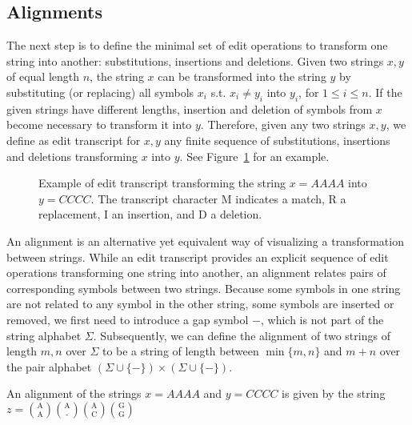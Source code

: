 \subsection{Alignments}

The next step is to define the minimal set of edit operations to transform one string into another: substitutions, insertions and deletions.
Given two strings $x,y$ of equal length $n$, the string $x$ can be transformed into the string $y$ by substituting (or replacing) all symbols $x_i$ s.t. $x_i \neq y_i$ into $y_i$, for $1 \leq i \leq n$.
If the given strings have different lengths, insertion and deletion of symbols from $x$ become necessary to transform it into $y$.
Therefore, given any two strings $x,y$, we define as edit transcript for $x,y$ any finite sequence of substitutions, insertions and deletions transforming $x$ into $y$.
See Figure~\ref{fig:edit-transcript} for an example.

\begin{figure}[h]
\begin{center}
\caption[Example of edit transcript.]{Example of edit transcript transforming the string $x=AAAA$ into $y=CCCC$. The transcript character M indicates a match, R a replacement, I an insertion, and D a deletion.}
\label{fig:edit-transcript}

\end{center}
\end{figure}

An alignment is an alternative yet equivalent way of visualizing a transformation between strings.
While an edit transcript provides an explicit sequence of edit operations transforming one string into another, an alignment relates pairs of corresponding symbols between two strings.
Because some symbols in one string are not related to any symbol in the other string, \ie some symbols are inserted or removed, we first need to introduce a gap symbol $-$, which is not part of the string alphabet $\Sigma$.
Subsequently, we can define the alignment of two strings of length $m,n$ over $\Sigma$ to be a string of length between $\min\{m,n\}$ and $m+n$ over the pair alphabet $(\Sigma \cup \{ - \}) \times (\Sigma \cup \{ - \})$.

\begin{example}
\label{ex:alignment}
An alignment of the strings $x=AAAA$ and $y=CCCC$ is given by the string
$z={\text{A} \choose \text{A}}{\text{A} \choose \text{-}}{\text{A} \choose \text{C}}{\text{G} \choose \text{G}}$
\end{example}

